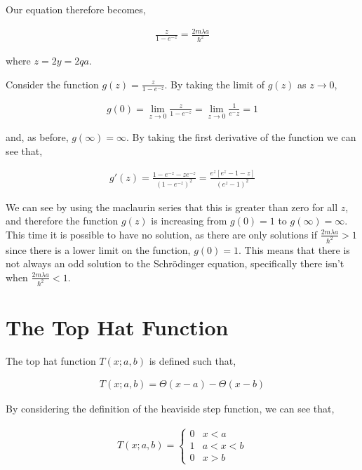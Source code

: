 \documentclass[11pt]{amsart}
\begin{document}
Our equation therefore becomes,

\begin{align*}
  \frac{z}{1 - e^{-z}} = \frac{2m\lambda a}{\hbar^2}
\end{align*}

where $z = 2y = 2qa$.

Consider the function $g(z) = \frac{z}{1 - e^{-z}}$. By taking the limit of $g(z)$ as $z \to 0$,

\begin{align*}
  g(0) = \lim_{z\to 0} \frac{z}{1 - e^{-z}} = \lim_{z\to 0} \frac{1}{e^-z} = 1
\end{align*}

and, as before, $g(\infty) = \infty$. By taking the first derivative of the function we can see that,

\begin{align*}
  g'(z) = \frac{1-e^{-z}-ze^{-z}}{{\left(1 - e^{-z}\right)}^2} = \frac{e^z \left[e^z - 1 - z\right]}{{\left(e^z - 1\right)}^2}
\end{align*}

We can see by using the maclaurin series that this is greater than zero for all $z$, and therefore the function $g(z)$ is increasing from $g(0) = 1$ to $g(\infty) = \infty$. This time it is possible to have no solution, as there are only solutions if $\frac{2m\lambda a}{\hbar^2} > 1$ since there is a lower limit on the function, $g(0) = 1$. This means that there is not always an odd solution to the Schr\"{o}dinger equation, specifically there isn't when $\frac{2m\lambda a}{\hbar^2} < 1$.


\section{The Top Hat Function}

The top hat function $T(x; a, b)$ is defined such that,

\begin{align*}
  T(x; a, b) = \Theta(x - a) - \Theta(x - b)
\end{align*}

By considering the definition of the heaviside step function, we can see that,

\begin{align*}
  T(x; a, b) =
  \begin{cases}
    0 & x < a \\
    1 & a < x < b \\
    0 & x > b
  \end{cases}
\end{align*}
\end{document}
